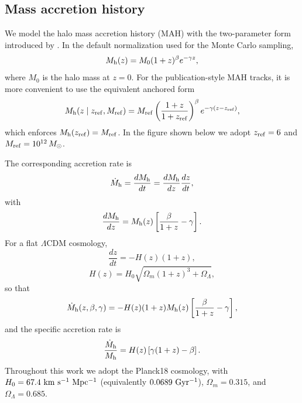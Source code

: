 \subsection{Mass accretion history}

We model the halo mass accretion history (MAH) with the two-parameter form introduced by \citet{McBride2009MNRAS}. In the default normalization used for the Monte Carlo sampling,
\begin{equation}
    M_{\rm h}(z)=M_0(1+z)^\beta e^{-\gamma z},
\end{equation}
where $M_0$ is the halo mass at $z=0$. For the publication-style MAH tracks, it is more convenient to use the equivalent anchored form
\begin{equation}
    M_{\rm h}(z\mid z_{\rm ref},M_{\rm ref})=
    M_{\rm ref}
    \left(\frac{1+z}{1+z_{\rm ref}}\right)^\beta
    e^{-\gamma (z-z_{\rm ref})},
\end{equation}
which enforces $M_{\rm h}(z_{\rm ref})=M_{\rm ref}$. In the figure shown below we adopt $z_{\rm ref}=6$ and $M_{\rm ref}=10^{12}\,M_\odot$.

The corresponding accretion rate is
\begin{equation}
    \dot{M}_{\rm h}=\frac{dM_{\rm h}}{dt}
    =\frac{dM_{\rm h}}{dz}\frac{dz}{dt},
\end{equation}
with
\begin{equation}
    \frac{dM_{\rm h}}{dz}
    =
    M_{\rm h}(z)\left[\frac{\beta}{1+z}-\gamma\right].
\end{equation}
For a flat $\Lambda$CDM cosmology,
\begin{equation}
    \frac{dz}{dt}=-H(z)(1+z),
\end{equation}
\begin{equation}
    H(z)=H_0\sqrt{\Omega_m(1+z)^3+\Omega_\Lambda},
\end{equation}
so that
\begin{equation}
    \dot{M}_{\rm h}(z,\beta,\gamma)
    =
    -H(z)(1+z)M_{\rm h}(z)\left[\frac{\beta}{1+z}-\gamma\right],
\end{equation}
and the specific accretion rate is
\begin{equation}
    \frac{\dot{M}_{\rm h}}{M_{\rm h}}
    =
    H(z)\left[\gamma(1+z)-\beta\right].
\end{equation}
Throughout this work we adopt the Planck18 cosmology, with $H_0=67.4~{\rm km~s^{-1}~Mpc^{-1}}$ (equivalently $0.0689~{\rm Gyr^{-1}}$), $\Omega_m=0.315$, and $\Omega_\Lambda=0.685$.

